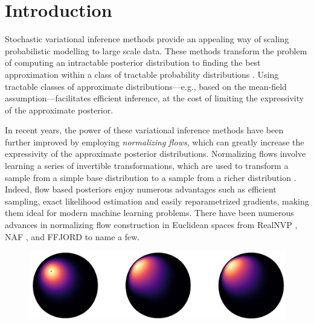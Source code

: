 \section{Introduction}
Stochastic variational inference methods provide an appealing way of scaling probabilistic modelling to large scale data.
These methods transform the problem of computing an intractable posterior distribution to finding the best approximation within a class of tractable probability distributions \cite{hoffman2013stochastic}.
Using tractable classes of approximate distributions---e.g., based on the mean-field assumption---facilitates efficient inference, at the cost of limiting the expressivity of the approximate posterior. 

In recent years, the power of these variational inference methods have been further improved by employing {\em normalizing flows}, which can greatly increase the expressivity of the approximate posterior distributions. 
Normalizing flows involve learning a series of invertible transformations, which are used to transform a sample from a simple base distribution to a sample from a richer distribution \cite{rezende2015variational}. 
Indeed, flow based posteriors enjoy numerous advantages such as efficient sampling, exact likelihood estimation and easily reparametrized gradients, making them ideal for modern machine learning problems.
There have been numerous advances in normalizing flow construction in Euclidean spaces from RealNVP \cite{dinh2016density}, NAF \cite{huang2018neural}, and FFJORD \cite{grathwohl2018ffjord} to name a few.

\begin{figure}
    \centering
    \vspace{-10pt}
    \includegraphics[width=\linewidth]{hyperbolic_density_graphic.pdf}
    \vspace{-10pt}
    \caption{ }
    \vspace{-10pt}
    \label{fig:my_label}
\end{figure}

